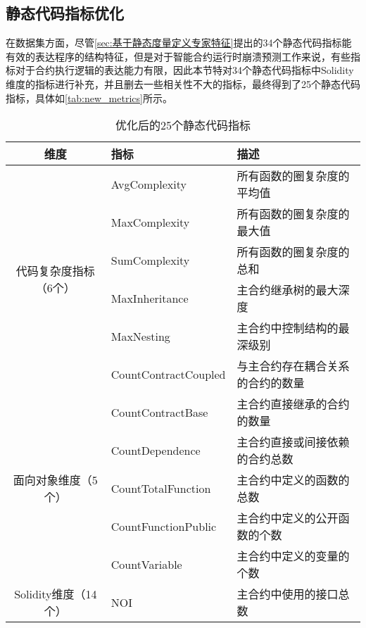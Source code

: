 \subsection{静态代码指标优化}
在数据集方面，尽管\autoref{sec:基于静态度量定义专家特征}提出的34个静态代码指标能有效的表达程序的结构特征，但是对于智能合约运行时崩溃预测工作来说，有些指标对于合约执行逻辑的表达能力有限，因此本节特对34个静态代码指标中Solidity维度的指标进行补充，并且删去一些相关性不大的指标，最终得到了25个静态代码指标，具体如\autoref{tab:new_metrics}所示。
\begin{table}[htbp]
    \caption{\label{tab:new_metrics}优化后的25个静态代码指标}
    \small
            \renewcommand{\arraystretch}{1.5}
        \begin{tabularx}{\linewidth}{cp{3.5cm}<{\centering}X<{\raggedright}}
            \hline
            \textbf{维度}            & \textbf{指标}              & \textbf{描述} \\ \hline
            \multirow{6}{*}{代码复杂度指标（6个）} & AvgComplexity        & 所有函数的圈复杂度的平均值 \\
                                       & MaxComplexity        & 所有函数的圈复杂度的最大值 \\
                                       & SumComplexity        & 所有函数的圈复杂度的总和 \\
                                       & MaxInheritance   & 主合约继承树的最大深度 \\
                                       & MaxNesting           & 主合约中控制结构的最深级别 \\
                                       & CountContractCoupled  & 与主合约存在耦合关系的合约的数量 \\ \hline
            \multirow{5}{*}{面向对象维度（5个）} & CountContractBase    &  主合约直接继承的合约的数量 \\
                                       & CountDependence      & 主合约直接或间接依赖的合约总数 \\
                                       & CountTotalFunction   & 主合约中定义的函数的总数 \\
                                       & CountFunctionPublic  & 主合约中定义的公开函数的个数 \\
                                       & CountVariable        & 主合约中定义的变量的个数 \\ \hline
            \multirow{14}{*}{Solidity维度（14个）} & NOI                 & 主合约中使用的接口总数 \\

\end{tabularx}
\end{table}
